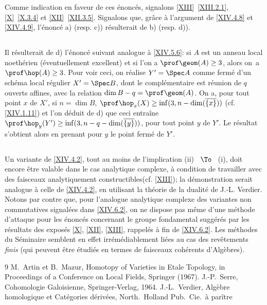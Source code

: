 Comme indication en faveur de ces \'enonc\'es, signalons \ref{XIII}~\ref{XIII.2.1}, \ref{X}~\ref{X.3.4} et \ref{XII}~\ref{XII.3.5}. Signalons que, gr\^ace \`a l'argument de \ref{XIV.4.8} et \ref{XIV.4.9}, l'\'enonc\'e a) (resp. c)) r\'esulterait de b) (resp. d)).

\subsection{} \label{XIV.6.3}
Il r\'esulterait de d) l'\'enonc\'e suivant analogue \`a \ref{XIV.5.6}: si $A$ est un anneau local noeth\'erien (\'eventuellement excellent) et si l'on a $\prof \geom (A) \geq 3$, alors on~a $\prof \hop (A) \geq 3$. Pour voir ceci, on r\'ealise $Y'=\Spec A$ comme ferm\'e d'un sch\'ema local r\'egulier $X'=\Spec B$, dont le compl\'ementaire est r\'eunion de $q$ ouverts affines, avec la relation $\dim B -q=\prof \geom(A)$. On a, pour tout point $x$ de $X'$, si $n=\dim B$, $\prof \hop_x(X) \geq \inf(3, n-\dim(\overline{\{x\}}))$ (cf. \ref{XIV.1.11}) et l'on d\'eduit de d) que ceci entra\^ine $\prof \hop_y(Y') \geq \inf(3, n-q-\dim(\overline{\{y\}}))$, pour tout point $y$ de $Y'$. Le r\'esultat s'obtient alors en prenant pour $y$ le point ferm\'e de $Y'$.

\subsection{} \label{XIV.6.4}
Un variante de \ref{XIV.4.2}, tout au moins de l'implication \textup{(ii)} ~$\To$~ \textup{(i)}, doit encore \^etre valable dans le cas analytique complexe, \`a condition de travailler avec des faisceaux \og analytiquement constructibles\fg (cf. \ref{XIII}); la d\'emonstration serait analogue \`a celle de \ref{XIV.4.2}, en utilisant la th\'eorie de la dualit\'e de J.-L. Verdier. Notons par contre que, pour l'analogue analytique complexe des variantes non commutatives signal\'ees dans \ref{XIV.6.2}, on ne dispose pas m\^eme d'une m\'ethode d'attaque pour les \'enonc\'es concernant le groupe fondamental sugg\'er\'es par les r\'esultats des expos\'es \ref{X}, \ref{XII}, \ref{XIII}, rappel\'es \`a fin de \ref{XIV.6.2}. Les m\'ethodes du S\'eminaire semblent en effet irr\'em\'ediablement li\'ees au cas des rev\^etements \emph{finis} (qui peuvent \^etre \'etudi\'es en termes de faisceaux coh\'erents d'Alg\`ebres).

\begin{thebibliography}{9}
%
M.\, Artin et B.\, Mazur, Homotopy of Varieties in Etale Topology, in Proceedings of a Conference on Local Fields, Springer (1967).
%
J.-P.\, Serre, Cohomologie Galoisienne, Springer-Verlag, 1964.
%
J.-L.\, Verdier, Alg\`ebre homologique et Cat\'egories d\'eriv\'ees, North.\ Holland Pub.\ Cie.\, \`a par\^itre
\end{thebibliography}


